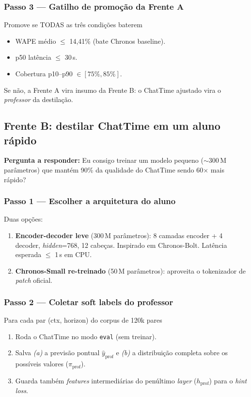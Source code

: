 \documentclass[11pt,a4paper]{article}
\newcommand{\code}[1]{\texttt{\small #1}}
\begin{document}
\subsubsection{Passo 3 --- Gatilho de promoção da Frente A}

\begin{infobox}{Promove se TODAS as três condições baterem}
\begin{itemize}[leftmargin=*]
\item WAPE médio $\le$ 14,41\% (bate Chronos baseline).
\item p50 latência $\le$ 30\,s.
\item Cobertura p10--p90 $\in [75\%, 85\%]$.
\end{itemize}
Se não, a Frente A vira insumo da Frente B: o ChatTime ajustado
vira o \emph{professor} da destilação.
\end{infobox}

\subsection{Frente B: destilar ChatTime em um aluno rápido}

\textbf{Pergunta a responder:} Eu consigo treinar um modelo pequeno
($\sim$300\,M parâmetros) que mantém 90\% da qualidade do ChatTime
sendo 60$\times$ mais rápido?

\subsubsection{Passo 1 --- Escolher a arquitetura do aluno}

Duas opções:

\begin{enumerate}[leftmargin=*]
\item \textbf{Encoder-decoder leve} (300\,M parâmetros): 8 camadas
encoder + 4 decoder, \emph{hidden}=768, 12 cabeças. Inspirado em
Chronos-Bolt. Latência esperada $\le$ 1\,s em CPU.
\item \textbf{Chronos-Small re-treinado} (50\,M parâmetros):
aproveita o tokenizador de \emph{patch} oficial.
\end{enumerate}

\subsubsection{Passo 2 --- Coletar soft labels do professor}

\begin{passo}{Para cada par (ctx, horizon) do corpus de 120k pares}
\begin{enumerate}[leftmargin=*]
\item Roda o ChatTime no modo \code{eval} (sem treinar).
\item Salva \emph{(a)} a previsão pontual $\hat{y}_\text{prof}$ e
\emph{(b)} a distribuição completa sobre os possíveis valores
($\pi_\text{prof}$).
\item Guarda também \emph{features} intermediárias do penúltimo
\emph{layer} ($h_\text{prof}$) para o \emph{hint loss}.
\end{enumerate}
\end{passo}
\end{document}
